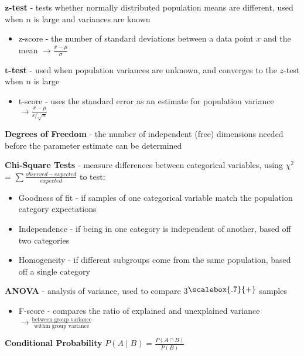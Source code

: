 \documentclass[10pt,landscape]{article}
\newcommand{\plus}{\raisebox{.3\height}{\scalebox{.7}{+}}}
\begin{document}
\begin{multicols}{3}
$\boldsymbol{z}$\textbf{-test} - tests whether normally distributed population means are different, used when $n$ is large and variances are known
\vspace{-.5mm}
\begin{itemize}[label={--},leftmargin=4mm]
    \itemsep -.4mm
    \item z-score - the number of standard deviations between a data point $x$ and the mean $\to \frac{x - \mu}{\sigma}$
\end{itemize}
\vspace{-.5mm}
$\boldsymbol{t}$\textbf{-test} - used when population variances are unknown, and converges to the $z$-test when $n$ is large
\vspace{-.5mm}
\begin{itemize}[label={--},leftmargin=4mm]
    \itemsep -.4mm
    \item t-score - uses the standard error as an estimate for population variance $\to \frac{x - \mu}{s/\sqrt{n}}$
\end{itemize}
\vspace{-1mm}
\textbf{Degrees of Freedom} - the number of independent (free) dimensions needed before the parameter estimate can be determined

\textbf{Chi-Square Tests} - measure differences between categorical variables, using $\chi^2$ = $\sum \frac{observed - expected}{expected}$ to test:
\begin{itemize}[label={--},leftmargin=4mm]
    \itemsep -.4mm
    \item Goodness of fit - if samples of one categorical variable match the population category expectations
    \item Independence -  if being in one category is independent of another, based off two categories
    \item Homogeneity - if different subgroups come from the same population, based off a single category
\end{itemize}

\textbf{ANOVA} - analysis of variance, used to compare 3$\plus$ samples
\begin{itemize}[label={--},leftmargin=4mm]
    \itemsep -.4mm
    \item F-score - compares the ratio of explained and unexplained variance $\to \frac{\text{between group variance}}{\text{within group variance}}$
\end{itemize}

\smallskip

\textbf{Conditional Probability} $P(A \mid B) = \frac{P(A \cap B)}{P(B)}$


\end{multicols}
\end{document}
